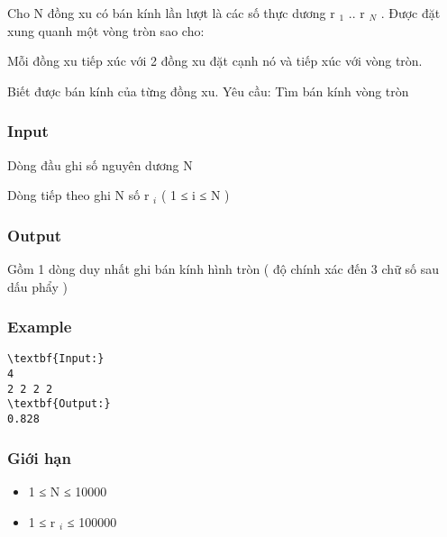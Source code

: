 



   Cho N đồng xu có bán kính lần lượt là các số thực dương r   $_    1   $   .. r   $_    N   $   . Được đặt xung quanh một vòng tròn sao cho:  

   Mỗi đồng xu tiếp xúc với 2 đồng xu đặt cạnh nó và tiếp xúc với vòng tròn.  

   Biết được bán kính của từng đồng xu. Yêu cầu: Tìm bán kính vòng tròn  

\subsubsection{   Input  }

   Dòng đầu ghi số nguyên dương N  

   Dòng tiếp theo ghi N số r   $_    i   $   ( 1 ≤ i ≤ N )  

\subsubsection{   Output  }

   Gồm 1 dòng duy nhất ghi bán kính hình tròn ( độ chính xác đến 3 chữ số sau dấu phẩy )  

\subsubsection{   Example  }
\begin{verbatim}
\textbf{Input:}
4
2 2 2 2
\textbf{Output:}
0.828
\end{verbatim}

\subsubsection{   Giới hạn  }
\begin{itemize}
	\item     1 ≤ N ≤ 10000   
	\item     1 ≤ r    $_     i    $    ≤ 100000   
\end{itemize}